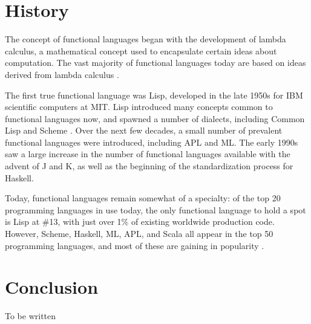 \documentclass{article}
\begin{document}
\section{History}

The concept of functional languages began with the development of lambda calculus, a mathematical concept used to encapsulate certain ideas about computation. The vast majority of functional languages today are based on ideas derived from lambda calculus \cite{combinatorylogic}.

The first true functional language was Lisp, developed in the late 1950s for IBM scientific computers at MIT. Lisp introduced many concepts common to functional languages now, and spawned a number of dialects, including Common Lisp and Scheme \cite{historyoflisp}. Over the next few decades, a small number of prevalent functional languages were introduced, including APL and ML. The early 1990s saw a large increase in the number of functional languages available with the advent of J and K, as well as the beginning of the standardization process for Haskell.

Today, functional languages remain somewhat of a specialty: of the top 20 programming languages in use today, the only functional language to hold a spot is Lisp at \#13, with just over 1\% of existing worldwide production code. However, Scheme, Haskell, ML, APL, and Scala all appear in the top 50 programming languages, and most of these are gaining in popularity \cite{TIOBE}.











\section{Conclusion}

To be written



\end{document}
